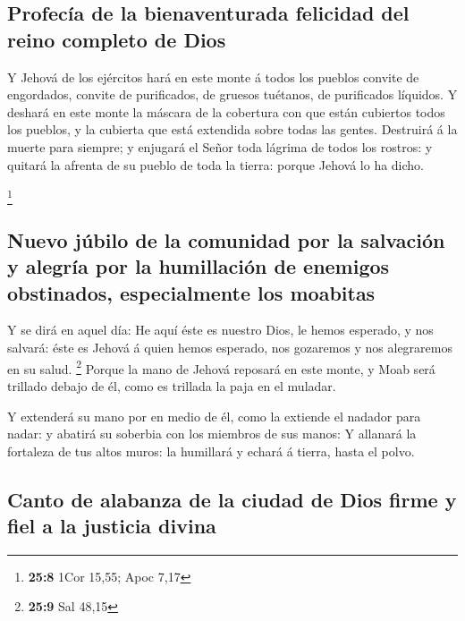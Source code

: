 \hypertarget{profecuxeda-de-la-bienaventurada-felicidad-del-reino-completo-de-dios}{%
\subsection{Profecía de la bienaventurada felicidad del reino completo
de
Dios}\label{profecuxeda-de-la-bienaventurada-felicidad-del-reino-completo-de-dios}}

 Y Jehová de los ejércitos hará en este monte á todos los
pueblos convite de engordados, convite de purificados, de gruesos
tuétanos, de purificados líquidos.  Y deshará en este
monte la máscara de la cobertura con que están cubiertos todos los
pueblos, y la cubierta que está extendida sobre todas las gentes.
 Destruirá á la muerte para siempre; y enjugará el Señor
toda lágrima de todos los rostros: y quitará la afrenta de su pueblo de
toda la tierra: porque Jehová lo ha dicho.

\footnote{\textbf{25:8} 1Cor 15,55; Apoc 7,17}

\hypertarget{nuevo-juxfabilo-de-la-comunidad-por-la-salvaciuxf3n-y-alegruxeda-por-la-humillaciuxf3n-de-enemigos-obstinados-especialmente-los-moabitas}{%
\subsection{Nuevo júbilo de la comunidad por la salvación y alegría por
la humillación de enemigos obstinados, especialmente los
moabitas}\label{nuevo-juxfabilo-de-la-comunidad-por-la-salvaciuxf3n-y-alegruxeda-por-la-humillaciuxf3n-de-enemigos-obstinados-especialmente-los-moabitas}}

 Y se dirá en aquel día: He aquí éste es nuestro Dios, le
hemos esperado, y nos salvará: éste es Jehová á quien hemos esperado,
nos gozaremos y nos alegraremos en su salud. \footnote{\textbf{25:9} Sal
  48,15}  Porque la mano de Jehová reposará en este
monte, y Moab será trillado debajo de él, como es trillada la paja en el
muladar.

 Y extenderá su mano por en medio de él, como la extiende
el nadador para nadar: y abatirá su soberbia con los miembros de sus
manos:  Y allanará la fortaleza de tus altos muros: la
humillará y echará á tierra, hasta el polvo.

\hypertarget{canto-de-alabanza-de-la-ciudad-de-dios-firme-y-fiel-a-la-justicia-divina}{%
\subsection{Canto de alabanza de la ciudad de Dios firme y fiel a la
justicia
divina}\label{canto-de-alabanza-de-la-ciudad-de-dios-firme-y-fiel-a-la-justicia-divina}}

